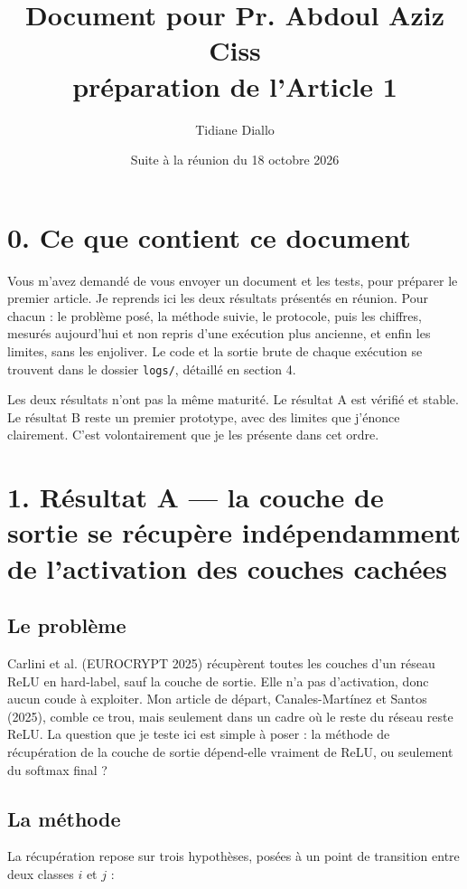 \documentclass[11pt]{article}
\title{\vspace{-1.5cm}Document pour Pr. Abdoul Aziz Ciss\\\large préparation de l'Article 1}
\author{Tidiane Diallo}
\date{Suite à la réunion du 18 octobre 2026}
\begin{document}
\maketitle

\section*{0. Ce que contient ce document}

Vous m'avez demandé de vous envoyer un document et les tests, pour préparer le premier article. Je reprends ici les deux résultats présentés en réunion. Pour chacun : le problème posé, la méthode suivie, le protocole, puis les chiffres, mesurés aujourd'hui et non repris d'une exécution plus ancienne, et enfin les limites, sans les enjoliver. Le code et la sortie brute de chaque exécution se trouvent dans le dossier \texttt{logs/}, détaillé en section 4.

Les deux résultats n'ont pas la même maturité. Le résultat A est vérifié et stable. Le résultat B reste un premier prototype, avec des limites que j'énonce clairement. C'est volontairement que je les présente dans cet ordre.

\section*{1. Résultat A --- la couche de sortie se récupère indépendamment de l'activation des couches cachées}

\subsection*{Le problème}

Carlini et al. (EUROCRYPT 2025) récupèrent toutes les couches d'un réseau ReLU en hard-label, sauf la couche de sortie. Elle n'a pas d'activation, donc aucun coude à exploiter. Mon article de départ, Canales-Martínez et Santos (2025), comble ce trou, mais seulement dans un cadre où le reste du réseau reste ReLU. La question que je teste ici est simple à poser : la méthode de récupération de la couche de sortie dépend-elle vraiment de ReLU, ou seulement du softmax final ?

\subsection*{La méthode}

La récupération repose sur trois hypothèses, posées à un point de transition entre deux classes $i$ et $j$ :
\end{document}
